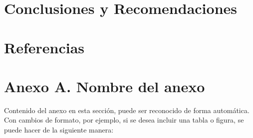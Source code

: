 \documentclass[12pt]{article}
\newcommand{\chapterbreak}{\clearpage \thispagestyle{fancy}}
\begin{document}
\section{Conclusiones y Recomendaciones}


\chapterbreak
\def\refname{}
\section*{Referencias}
\printbibliography[heading=bibintoc]

\chapterbreak
\appendix
\section*{Anexo A. Nombre del anexo}
Contenido del anexo en esta sección, puede ser reconocido de forma automática. Con cambios de formato, por ejemplo, si se desea incluir una tabla o figura, se puede hacer de la siguiente manera:
\end{document}
